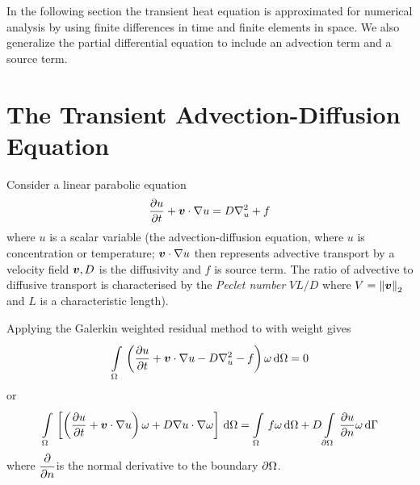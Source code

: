 In the following section the transient heat equation is approximated for
numerical analysis by using finite differences in time and finite elements in
space. We also generalize the partial differential equation to include an
advection term and a source term.


\section{The Transient Advection-Diffusion Equation}
\label{sec:transient}

Consider a linear parabolic equation
\begin{equation}
  \delby{u}{t} +\dotprod{\vect{v}}{\grad u} = D\laplacian{u} + f
  \label{eqn:lpe}
\end{equation}
where $u$ is a scalar variable (\eg the advection-diffusion
equation, where $u$ is concentration or
temperature; $\dotprod{\vect{v}}{\grad u}$ then represents advective transport
by a velocity field $\vect{v}, D$ is the diffusivity and $f$ is source term.
The ratio of advective to diffusive transport is characterised by the
\emph{Peclet number} $VL/D$ where $V = \norm{\vect{v}}$ and $L$ is a
characteristic length).

Applying the Galerkin weighted residual method to  with
weight \vect{\omega} gives
\begin{displaymath}
  \goneint{\pbrac{\delby{u}{t} + \dotprod{\vect{v}}{\grad u} 
    - D\laplacian{u}-f}\omega}{\Omega} =0
  \label{eqn:Gal}
\end{displaymath}
or
\begin{equation}
  \goneint{\sqbrac{\pbrac{\delby{u}{t} + \dotprod{\vect{v}}{\grad u}} 
    \omega + D\dotprod{\grad u}{\grad \omega}}}{\Omega}= \goneint{f\omega}{\Omega}
  + D \gint{\del \Omega}{}{\delby{u}{n}\omega}{\Gamma}
  \label{eqn:Gal2}
\end{equation}
where $ \dfrac{\partial  }{\partial n} $is the normal derivative to the boundary $\partial \Omega$.

